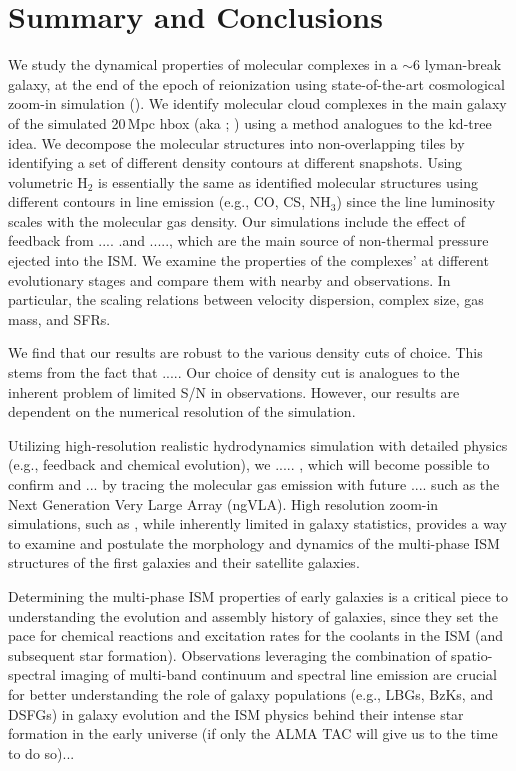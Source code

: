 \documentclass[apj]{emulateapj} %
\begin{document}
{\section{Summary and Conclusions}      \label{sec:conclusion}

We study the dynamical properties of molecular complexes in a \z$\sim$6 lyman-break galaxy,
at the end of the epoch of reionization using state-of-the-art cosmological zoom-in simulation
(). We identify molecular cloud complexes in the main galaxy of the
simulated 20\,Mpc h\pmOne box (aka \flower; \citealt{Pallottini17a}) using a method analogues
to the kd-tree idea. We decompose the molecular structures into non-overlapping tiles
by identifying a set of different density contours at different snapshots.
Using volumetric H$_2$ is essentially the same as identified molecular structures using
different contours in line emission (e.g., CO, CS, NH$_3$)
since the line luminosity scales with the molecular gas density.
Our simulations include the effect of feedback from .... .and ....., which are the main source
of non-thermal pressure ejected into the ISM.
We examine the properties of the complexes' at different evolutionary stages and compare
them with nearby and \highz observations. In particular,
the scaling relations between velocity dispersion, complex size, gas mass,
and SFRs.

We find that our results are robust to the various density cuts of choice.
This stems from the
fact that ..... Our choice of density cut is analogues to the inherent problem of limited S/N
in observations.
However, our results are dependent on the numerical resolution of the simulation.

Utilizing high-resolution realistic hydrodynamics simulation with
detailed physics (e.g., feedback and chemical evolution), we
..... , which will become possible to confirm and ... by tracing
the molecular gas emission with future .... such as the Next Generation Very Large Array (ngVLA).
High resolution zoom-in simulations, such as , while inherently limited in galaxy
statistics, provides a way to examine and postulate the morphology and dynamics of
the multi-phase ISM structures of the first galaxies and their satellite galaxies.

Determining the multi-phase ISM properties of early galaxies
is a critical piece to understanding the evolution and
assembly history of galaxies, since they set the pace
for chemical reactions and excitation rates for the coolants in the ISM (and subsequent star formation).
Observations leveraging the combination of spatio-spectral imaging of
multi-band continuum and spectral line emission are crucial for better understanding
the role of \highz galaxy populations
(e.g., LBGs, BzKs, and DSFGs) in
galaxy evolution and the ISM physics behind their intense star formation in the early universe
(if only the ALMA TAC will give us to the time to do so)...


}
\end{document}
